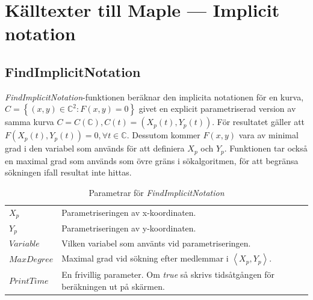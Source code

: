 \chapter[Källtexter --- Implicit notation]{Källtexter till Maple --- Implicit notation}
\label{FindImplicitNotation}

\section{FindImplicitNotation}

\emph{FindImplicitNotation}-funktionen beräknar den implicita notationen för en kurva, $C=\left\{(x,y)\in \mathbb{C}^2 : F(x,y)=0\right\}$ givet en explicit parametriserad version av samma kurva $C=C(\mathbb{C}), C(t)=(X_p(t),Y_p(t))$. För resultatet gäller att $F(X_p(t),Y_p(t))=0, \forall t \in \mathbb{C}$. Dessutom kommer $F(x,y)$ vara av minimal grad i den variabel som används för att definiera $X_p$ och $Y_p$. Funktionen tar också en maximal grad som används som övre gräns i sökalgoritmen, för att begränsa sökningen ifall resultat inte hittas.

\begin{table}[h]
\caption{Parametrar för \emph{FindImplicitNotation}}
\begin{center}
\begin{tabular}{|l|p{9cm}|}
\hline
$X_p$ & Parametriseringen av x-koordinaten. \\
$Y_p$ & Parametriseringen av y-koordinaten. \\
$Variable$ & Vilken variabel som använts vid parametriseringen.\\
$MaxDegree$ & Maximal grad vid sökning efter medlemmar i $\left<X_p , Y_p\right>$.\\
$PrintTime$ & En frivillig parameter. Om \emph{true} så skrivs tidsåtgången för beräkningen ut på skärmen.\\
\hline
\end{tabular}
\end{center}
\end{table}


